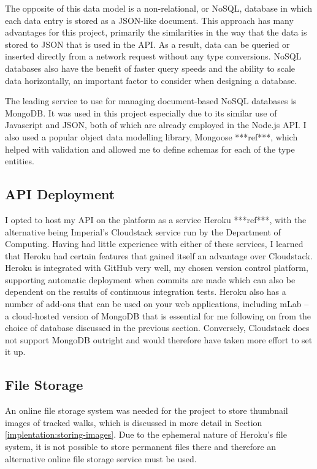 The opposite of this data model is a non-relational, or NoSQL, database in which each data entry is stored as a JSON-like document. This approach has many advantages for this project, primarily the similarities in the way that the data is stored to JSON that is used in the API. As a result, data can be queried or inserted directly from a network request without any type conversions. NoSQL databases also have the benefit of faster query speeds and the ability to scale data horizontally, an important factor to consider when designing a database.

The leading service to use for managing document-based NoSQL databases is MongoDB. It was used in this project especially due to its similar use of Javascript and JSON, both of which are already employed in the Node.js API. I also used a popular object data modelling library, Mongoose ***ref***, which helped with validation and allowed me to define schemas for each of the type entities.

\subsection{API Deployment}

I opted to host my API on the platform as a service Heroku ***ref***, with the alternative being Imperial's Cloudstack service run by the Department of Computing. Having had little experience with either of these services, I learned that Heroku had certain features that gained itself an advantage over Cloudstack. Heroku is integrated with GitHub very well, my chosen version control platform, supporting automatic deployment when commits are made which can also be dependent on the results of continuous integration tests. Heroku also has a number of add-ons that can be used on your web applications, including mLab -- a cloud-hosted version of MongoDB that is essential for me following on from the choice of database discussed in the previous section. Conversely, Cloudstack does not support MongoDB outright and would therefore have taken more effort to set it up.


\subsection{File Storage}


An online file storage system was needed for the project to store thumbnail images of tracked walks, which is discussed in more detail in Section \ref{implentation:storing-images}. Due to the ephemeral nature of Heroku's file system, it is not possible to store permanent files there and therefore an alternative online file storage service must be used.

